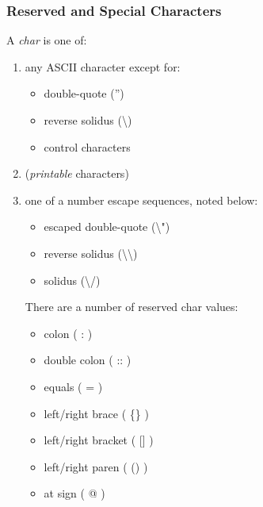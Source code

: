 \documentclass{article}
\begin{document}
		\subsubsection{Reserved and Special Characters}
			A \emph{char} is one of:
			\begin{enumerate}
				\item any ASCII character except for:
				\begin{itemize}
					\item double-quote ('') 
					\item reverse solidus (\textbackslash)
					\item control characters
				\end{itemize}
				\item (\emph{printable} characters)
				\item one of a number escape sequences, noted below:
				\begin{itemize}
					\item escaped double-quote (\textbackslash")
					\item reverse solidus (\textbackslash\textbackslash)
					\item solidus (\textbackslash/)
				\end{itemize}
				There are a number of reserved char values:
				\begin{itemize}
					\item colon ( : )
					\item double colon ( :: )
					\item equals ( = )
					\item left/right brace ( \{\} )
					\item left/right bracket ( [] )
					\item left/right paren ( () )
					\item at sign ( @ )
				\end{itemize}		
			\end{enumerate}
			
\end{document}
